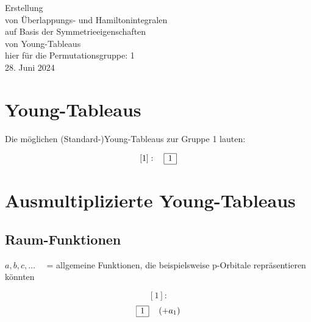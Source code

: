 \documentclass[fleqn]{article}%
\newcommand{\checkpagebreak}{\needspace{.25\textheight}}%
\begin{document}
%
\normalsize%
\noindent%
\thispagestyle{empty}%
\begin{center}%
\vspace*{4cm}%
\Huge{}%
Erstellung %
\\ %
 von Überlappungs{-} und Hamiltonintegralen %
\\ %
 auf Basis der Symmetrieeigenschaften %
\\ %
 von Young{-}Tableaus%
\\ %
\vspace{1cm}%
\Large{hier für die Permutationsgruppe: 1}%
\\ %
\vspace{4cm}%
\Large{28. Juni 2024}%
\end{center}%
\newpage%
\setcounter{page}{1}%
\pagestyle{fancy}%
\fancyhf{}%
%
\fancyhead[R]{\nouppercase{\leftmark}}%
\renewcommand{\footrulewidth}{0.4pt}%
\fancyfoot[C]{\thepage}%
\section{Young{-}Tableaus}%
\label{sec:Young{-}Tableaus}%
Die möglichen (Standard-)Young-Tableaus zur Gruppe 1 lauten:

%
\vspace{0.25cm}%
\begin{dmath*}\left[1\right]:\quad\begin{array}{|c|} \hline 1\\ \cline{1-1} \end{array} \end{dmath*}%
\vspace{0.25cm}%
\newpage%
\section{Ausmultiplizierte Young{-}Tableaus}%
\label{sec:AusmultiplizierteYoung{-}Tableaus}%

%
\subsection{Raum{-}Funktionen}%
\label{subsec:Raum{-}Funktionen}%
$a, b, c, \hdots \quad $ = allgemeine Funktionen, die beispielsweise p-Orbitale repräsentieren könnten

%
\vspace{0.25cm}%
\begin{dmath*}\left[1\right]:\end{dmath*}%
\vspace{0.25cm}%
\begin{dmath*}\begin{array}{|c|} \hline 1\\ \cline{1-1} \end{array} \quad \left( + a_{1}\right) \end{dmath*}%
\vspace{0.25cm}%
\vspace{0.25cm}%
\checkpagebreak%
\end{document}
